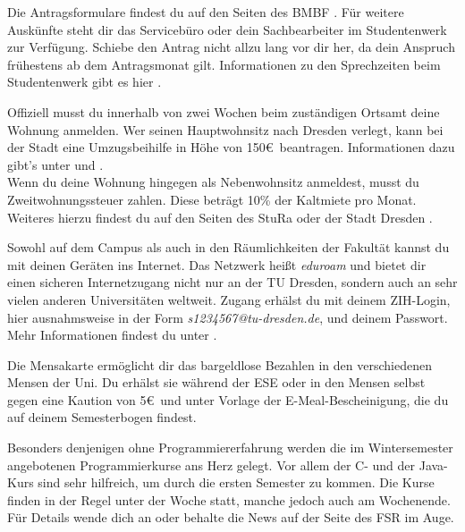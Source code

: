 \begin{itemize}[leftmargin=*]
Die Antragsformulare findest du auf den Seiten des BMBF
. Für weitere
Auskünfte steht dir das Servicebüro oder dein Sachbearbeiter im Studentenwerk
zur Verfügung. Schiebe den Antrag nicht allzu lang vor dir her, da dein Anspruch
frühestens ab dem Antragsmonat gilt. Informationen zu den Sprechzeiten beim
Studentenwerk gibt es hier
.

\newpage

Offiziell musst du innerhalb von zwei Wochen beim zuständigen Ortsamt
deine Wohnung anmelden. Wer seinen Hauptwohnsitz nach Dresden verlegt, kann bei
der Stadt eine \glqq{}Umzugsbeihilfe\grqq{} in Höhe von 150\euro\ beantragen.
Informationen dazu gibt's unter
 und
. \\
Wenn du deine Wohnung hingegen als Nebenwohnsitz anmeldest, musst du
Zweitwohnungssteuer zahlen. Diese beträgt 10\% der Kaltmiete pro Monat.
Weiteres hierzu findest du auf den Seiten des StuRa
 oder der Stadt
Dresden
.

Sowohl auf dem Campus als auch in den Räumlichkeiten der Fakultät kannst du mit
deinen Geräten ins Internet. Das Netzwerk heißt \textit{eduroam} und bietet dir
einen sicheren Internetzugang nicht nur an der TU Dresden, sondern auch an sehr
vielen anderen Universitäten weltweit. Zugang erhälst du mit deinem ZIH-Login,
hier ausnahmsweise in der Form \textit{s1234567@tu-dresden.de}, und deinem
Passwort. Mehr Informationen findest du unter
.

Die Mensakarte ermöglicht dir das bargeldlose Bezahlen in den verschiedenen
Mensen der Uni. Du erhälst sie während der ESE oder in den Mensen selbst gegen
eine Kaution von 5\euro\ und unter Vorlage der E-Meal-Bescheinigung, die du auf
deinem Semesterbogen findest.

Besonders denjenigen ohne Programmiererfahrung werden die im Wintersemester
angebotenen Programmierkurse ans Herz gelegt. Vor allem der C- und der Java-Kurs
sind sehr hilfreich, um durch die ersten Semester zu kommen. Die Kurse finden in
der Regel unter der Woche statt, manche jedoch auch am Wochenende. Für Details
wende dich an  oder behalte die News auf der
Seite des FSR  im Auge.


\end{itemize}
